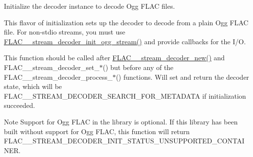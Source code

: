 Initialize the decoder instance to decode Ogg F\+L\+AC files.

This flavor of initialization sets up the decoder to decode from a plain Ogg F\+L\+AC file. For non-\/stdio streams, you must use \mbox{\hyperlink{group__flac__stream__decoder_ga78bf285b54e5aaee73a214c108683a72}{F\+L\+A\+C\+\_\+\+\_\+stream\+\_\+decoder\+\_\+init\+\_\+ogg\+\_\+stream()}} and provide callbacks for the I/O.

This function should be called after \mbox{\hyperlink{group__flac__stream__decoder_ga7159eefc074dfbab4a37462f69326091}{F\+L\+A\+C\+\_\+\+\_\+stream\+\_\+decoder\+\_\+new()}} and F\+L\+A\+C\+\_\+\+\_\+stream\+\_\+decoder\+\_\+set\+\_\+$\ast$() but before any of the F\+L\+A\+C\+\_\+\+\_\+stream\+\_\+decoder\+\_\+process\+\_\+$\ast$() functions. Will set and return the decoder state, which will be F\+L\+A\+C\+\_\+\+\_\+\+S\+T\+R\+E\+A\+M\+\_\+\+D\+E\+C\+O\+D\+E\+R\+\_\+\+S\+E\+A\+R\+C\+H\+\_\+\+F\+O\+R\+\_\+\+M\+E\+T\+A\+D\+A\+TA if initialization succeeded.

\begin{DoxyNote}{Note}
Support for Ogg F\+L\+AC in the library is optional. If this library has been built without support for Ogg F\+L\+AC, this function will return {\ttfamily F\+L\+A\+C\+\_\+\+\_\+\+S\+T\+R\+E\+A\+M\+\_\+\+D\+E\+C\+O\+D\+E\+R\+\_\+\+I\+N\+I\+T\+\_\+\+S\+T\+A\+T\+U\+S\+\_\+\+U\+N\+S\+U\+P\+P\+O\+R\+T\+E\+D\+\_\+\+C\+O\+N\+T\+A\+I\+N\+ER}.
\end{DoxyNote}

